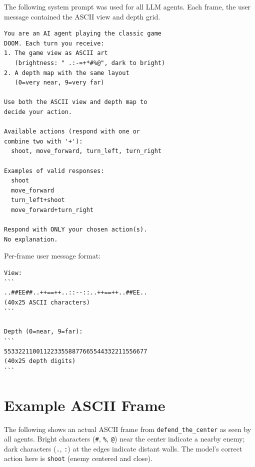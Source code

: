 \documentclass[11pt,a4paper]{article}
\begin{document}
The following system prompt was used for all LLM agents. Each frame, the user message contained the ASCII view and depth grid.

\begin{lstlisting}[basicstyle=\small\ttfamily,breaklines=true,frame=single]
You are an AI agent playing the classic game
DOOM. Each turn you receive:
1. The game view as ASCII art
   (brightness: " .:-=+*#%@", dark to bright)
2. A depth map with the same layout
   (0=very near, 9=very far)

Use both the ASCII view and depth map to
decide your action.

Available actions (respond with one or
combine two with '+'):
  shoot, move_forward, turn_left, turn_right

Examples of valid responses:
  shoot
  move_forward
  turn_left+shoot
  move_forward+turn_right

Respond with ONLY your chosen action(s).
No explanation.
\end{lstlisting}

Per-frame user message format:

\begin{lstlisting}[basicstyle=\small\ttfamily,breaklines=true,frame=single]
View:
```
..##EE##..++==++..::--::..++==++..##EE..
(40x25 ASCII characters)
```

Depth (0=near, 9=far):
```
5533221100112233558877665544332211556677
(40x25 depth digits)
```
\end{lstlisting}

\section{Example ASCII Frame}
\label{app:frame}

The following shows an actual ASCII frame from \texttt{defend\_the\_center} as seen by all agents. Bright characters (\texttt{\#}, \texttt{\%}, \texttt{@}) near the center indicate a nearby enemy; dark characters (\texttt{.}, \texttt{:}) at the edges indicate distant walls. The model's correct action here is \texttt{shoot} (enemy centered and close).
\end{document}
